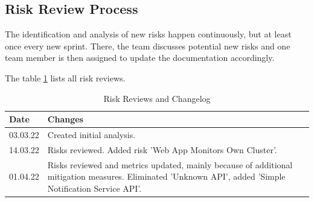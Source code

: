 \subsection{Risk Review Process}
The identification and analysis of new risks happen continuously, but at least once every new sprint. There, the team discusses potential new risks and one team member is then assigned to update the documentation accordingly.

The table \ref{tab:risk-review} lists all risk reviews.

\begin{table}[h!]
\centering
  \caption{\label{tab:risk-review}Risk Reviews and Changelog}
  \begin{tabular}{ | p{2cm} | p{11cm} | } \hline
    \textbf{Date} & \textbf{Changes} \\ \hline
    03.03.22 & Created initial analysis. \\ \hline
    14.03.22 & Risks reviewed. Added risk 'Web App Monitors Own Cluster'. \\ \hline
    01.04.22 & Risks reviewed and metrics updated, mainly because of additional mitigation measures. Eliminated 'Unknown API', added 'Simple Notification Service API'. \\ \hline
  \end{tabular}
\end{table}

